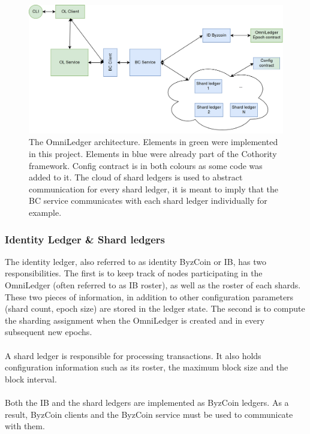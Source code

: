 \begin{figure}
	 \centering
	\includegraphics[width=\textwidth]{architecture.png}
	\caption{\label{fig:architecture} The OmniLedger architecture. Elements in green were implemented in this project. Elements in blue were already part of the Cothority framework. Config contract is in both colours as some code was added to it. The cloud of shard ledgers is used to abstract communication for every shard ledger, it is meant to imply that the BC service communicates with each shard ledger individually for example. }
\end{figure}

\subsubsection{Identity Ledger \& Shard ledgers}
The identity ledger, also referred to as identity ByzCoin or IB, has two responsibilities. The first is to keep track of nodes participating in the OmniLedger (often referred to as IB roster), as well as the roster of each shards. These two pieces of information, in addition to other configuration parameters (shard count, epoch size) are stored in the ledger state. The second is to compute the sharding assignment when the OmniLedger is created and in every subsequent new epochs.\\\\
A shard ledger is responsible for processing transactions. It also holds configuration information such as its roster, the maximum block size and the block interval. \\\\
Both the IB and the shard ledgers are implemented as ByzCoin ledgers. As a result, ByzCoin clients and the ByzCoin service must be used to communicate with them.

